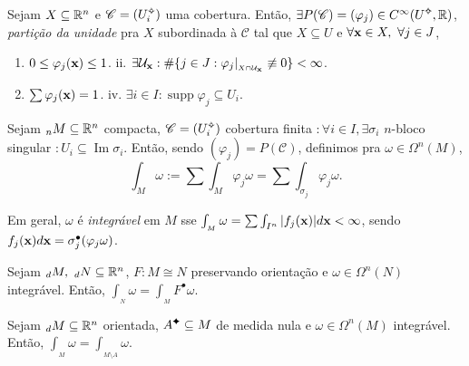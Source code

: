 \begin{theorem}
    Sejam \(X\subseteq \mathbb{R}^n\) e \(\mathscr{C} = (U_i\ab)\) uma cobertura. Então, \(\exists P(\mathscr{C}) = (\varphi_j) \in C^\infty(U\ab, \R)\), \emph{partição da unidade} pra \(X\) subordinada à \(\mathscr{C}\) tal que \( X \subseteq U\) e \(\forall \textbf{x} \in X, \ \forall j \in J\),     
    \begin{enumerate}[label = \roman*.]
        \item \( 0 \leq \varphi_j(\textbf{x}) \leq 1 \). \hspace{1.75cm} ii. \(\exists \mathcal{U}_{\textbf{x}} : \# \{j \in J : \varphi_j|_{_{X\cap \mathcal{U}_{\textbf{x}}}} \not\equiv 0 \} < \infty\). 
        \item[iii.] \(\sum \varphi_j(\textbf{x}) = 1\). \hspace{2cm} iv. \(\exists i \in I:  \operatorname{supp}\varphi_j  \subseteq  U_i\). 
    \end{enumerate}
\end{theorem}


\begin{definition}
    Sejam \(_nM\subseteq \mathbb{R}^n\) compacta, \(\mathscr{C} = (U\ab_i)\) cobertura finita  \(:\forall i \in I, \exists \sigma_i\) $n$-bloco singular \(:U_i \subseteq \operatorname{Im}\sigma_i\). Então, sendo \((\varphi_j) = P (\mathscr{C})\), definimos pra \(\omega \in \Omega^n(M)\),  
    \[\int_M \omega := \sum \int_M \varphi_j \omega = \sum \int_{\sigma_j} \varphi_j \omega . \] 
\end{definition}
\begin{note}
    Em geral, \(\omega \) é \emph{integrável} em \(M\) sse \(\int_{_M} \omega = \sum \int_{I^n} |f_j(\textbf{x})| d\textbf{x} < \infty \), sendo \(f_j(\textbf{x}) d\textbf{x} = \sigma_j^\bullet(\varphi_j \omega)\). 
\end{note}

\begin{proposition}
    Sejam \(_dM, \ _dN \subseteq \mathbb{R}^n\), \(F: M\cong N\) preservando orientação e \(\omega \in \Omega^n(N)\) integrável. Então, \(\int_{_N} \omega = \int_{_M} F^\bullet \omega\). 
\end{proposition}

\begin{proposition}
    Sejam \(_dM \subseteq \mathbb{R}^n\) orientada, \(A\ce\subseteq M\) de medida nula e \(\omega \in \Omega^n(M)\) integrável. Então, \(\int_{_M} \omega = \int_{_{M\setminus A}} \omega \). %
\end{proposition}

